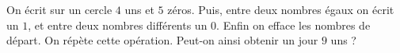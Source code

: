 On écrit sur un cercle $4$ uns et $5$ zéros. Puis, entre deux nombres égaux on écrit un $1$, et entre deux nombres différents un $0$. Enfin on efface les nombres de départ. On répète cette opération. Peut-on ainsi obtenir un jour $9$ uns ?
